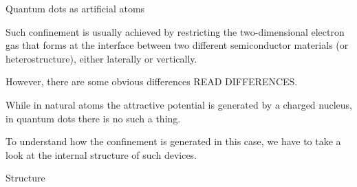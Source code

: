 \documentclass[10pt, compress, usetitleprogressbar, protectframetitle, handout]{beamer}
\begin{document}
\begin{frame}{Quantum dots as artificial atoms}
{		Such confinement is usually achieved by restricting the two-dimensional electron gas that forms at the interface between two different semiconductor materials (or heterostructure), either laterally or vertically.
		
		However, there are some obvious differences \alert{READ DIFFERENCES}.
		
		While in natural atoms the attractive potential is generated by a charged nucleus, in quantum dots there is no such a thing.
		
		To understand how the confinement is generated in this case, we have to take a look at the internal structure of such devices.
	}
	
\end{frame}

\begin{frame}{Structure}

	
	
	

\end{frame}
\end{document}
